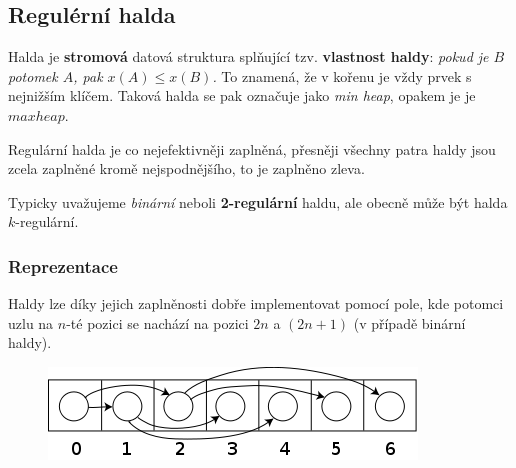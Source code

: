 \documentclass[11pt]{report} %
\numberwithin{equation}{section}
\begin{document}
\subsection{Regulérní halda}
Halda je \textbf{stromová} datová struktura splňující tzv. \textbf{vlastnost haldy}: \textit{pokud je $B$ potomek $A$, pak $x(A) \leq x(B)$.} To znamená, že v kořenu je vždy prvek s nejnižším klíčem. Taková halda se pak označuje jako \textit{min heap}, opakem je je $max heap$. 

Regulární halda je co nejefektivněji zaplněná, přesněji všechny patra haldy jsou zcela zaplněné kromě nejspodnějšího, to je zaplněno zleva.

Typicky uvažujeme \textit{binární} neboli \textbf{2-regulární} haldu, ale obecně může být halda $k$-regulární.

\subsubsection{Reprezentace}
Haldy lze díky jejich zaplněnosti dobře implementovat pomocí pole, kde potomci uzlu na $n$-té pozici se nachází na pozici $2n$ a $(2n+1)$ (v případě binární haldy).
\begin{figure}[H]
	\centering
	\includegraphics[scale=0.6]{img/heap.png}
\end{figure}
\end{document}

